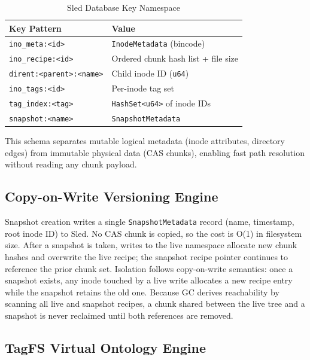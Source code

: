 \documentclass[conference]{IEEEtran}
\begin{document}
\begin{table}[t]
\caption{Sled Database Key Namespace}
\label{tab:schema}
\centering
\renewcommand{\arraystretch}{1.15}
\begin{tabular}{ll}
\toprule
\textbf{Key Pattern} & \textbf{Value} \\
\midrule
\texttt{ino\_meta:\textless{}id\textgreater{}} & \texttt{InodeMetadata} (bincode) \\
\texttt{ino\_recipe:\textless{}id\textgreater{}} & Ordered chunk hash list + file size \\
\texttt{dirent:\textless{}parent\textgreater{}:\textless{}name\textgreater{}} & Child inode ID (\texttt{u64}) \\
\texttt{ino\_tags:\textless{}id\textgreater{}} & Per-inode tag set \\
\texttt{tag\_index:\textless{}tag\textgreater{}} & \texttt{HashSet\textless{}u64\textgreater{}} of inode IDs \\
\texttt{snapshot:\textless{}name\textgreater{}} & \texttt{SnapshotMetadata} \\
\bottomrule
\end{tabular}
\end{table}

This schema separates mutable logical metadata (inode attributes, directory
edges) from immutable physical data (CAS chunks), enabling fast path
resolution without reading any chunk payload.

\subsection{Copy-on-Write Versioning Engine}

Snapshot creation writes a single \texttt{SnapshotMetadata} record
(name, timestamp, root inode ID) to Sled. No CAS chunk is copied, so the
cost is O(1) in filesystem size. After a snapshot is taken, writes to the
live namespace allocate new chunk hashes and overwrite the live recipe; the
snapshot recipe pointer continues to reference the prior chunk set. Isolation
follows copy-on-write semantics: once a snapshot exists, any inode touched
by a live write allocates a new recipe entry while the snapshot retains the
old one. Because GC derives reachability by scanning all live and snapshot
recipes, a chunk shared between the live tree and a snapshot is never
reclaimed until both references are removed.

\subsection{TagFS Virtual Ontology Engine}
\end{document}
